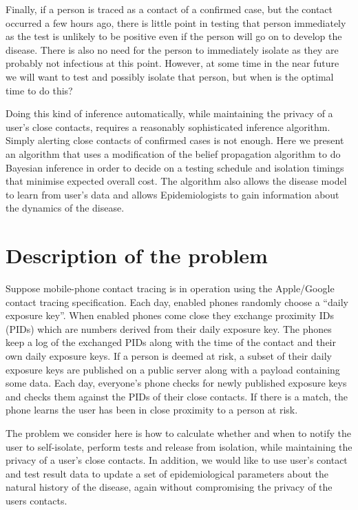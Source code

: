 \documentclass{article}
\begin{document}
Finally, if a person is traced as a contact of a confirmed case, but the contact occurred a few hours ago, there is little point in testing that person immediately as the test is unlikely to be positive even if the person will go on to develop the disease. There is also no need for the person to immediately isolate as they are probably not infectious at this point. However, at some time in the near future we will want to test and possibly isolate that person, but when is the optimal time to do this?

Doing this kind of inference automatically, while maintaining the privacy of a user's close contacts, requires a reasonably sophisticated inference algorithm. Simply alerting close contacts of confirmed cases is not enough. Here we present an algorithm that uses a modification of the belief propagation algorithm\cite{pearl2014probabilistic} to do Bayesian inference in order to decide on a testing schedule and isolation timings that minimise expected overall cost. The algorithm also allows the disease model to learn from user's data and allows Epidemiologists to gain information about the dynamics of the disease.

\section{Description of the problem}

Suppose mobile-phone contact tracing is in operation using the Apple/Google contact tracing specification\cite{applegoogle}. Each day, enabled phones randomly choose a ``daily exposure key''. When enabled phones come close they exchange proximity IDs (PIDs) which are numbers derived from their daily exposure key. The phones keep a log of the exchanged PIDs along with the time of the contact and their own daily exposure keys. If a person is deemed at risk, a subset of their daily exposure keys are published on a public server along with a payload containing some data. Each day, everyone's phone checks for newly published exposure keys and checks them against the PIDs of their close contacts. If there is a match, the phone learns the user has been in close proximity to a person at risk.

The problem we consider here is how to calculate whether and when to notify the user to self-isolate, perform tests and release from isolation, while maintaining the privacy of a user's close contacts. In addition, we would like to use user's contact and test result data to update a set of epidemiological parameters about the natural history of the disease, again without compromising the privacy of the users contacts.
\end{document}
